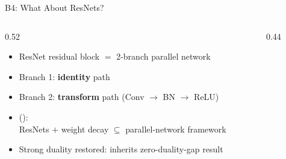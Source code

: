 %
%
\begin{frame}{B4: What About ResNets?}
  \begin{columns}[c]
    \begin{column}{0.52\textwidth}
      \begin{itemize}
        \item ResNet residual block $=$ 2-branch parallel network
        \item Branch 1: \textbf{identity} path
        \item Branch 2: \textbf{transform} path (Conv $\to$ BN $\to$ ReLU)
        \item \citeauthor{arxiv2110.06482} (\citeyear{arxiv2110.06482}):\\
              ResNets $+$ weight decay $\subseteq$ parallel-network framework
        \item Strong duality restored: inherits zero-duality-gap result
      \end{itemize}
    \end{column}
    \begin{column}{0.44\textwidth}
      \begin{center}
\end{center}
\end{column}
\end{columns}
\end{frame}
